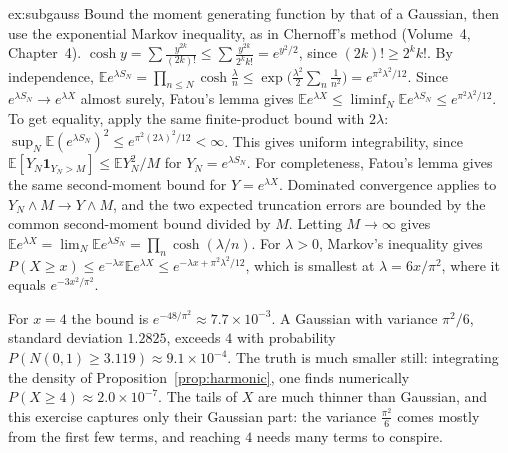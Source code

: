 \begin{solution}{ex:subgauss}
\idea Bound the moment generating function by that of a Gaussian, then use the exponential Markov inequality, as in Chernoff's method
(Volume~4, Chapter~4).
\writeup $\cosh y=\sum\frac{y^{2k}}{(2k)!}\le\sum\frac{y^{2k}}{2^kk!}=e^{y^2/2}$, since $(2k)!\ge2^kk!$. By independence,
$\mathbb E e^{\lambda S_N}=\prod_{n\le N}\cosh\frac\lambda n\le\exp\bigl(\frac{\lambda^2}2\sum_n\frac1{n^2}\bigr)=e^{\pi^2\lambda^2/12}$. Since
$e^{\lambda S_N}\to e^{\lambda X}$ almost surely, Fatou's lemma gives $\mathbb E e^{\lambda X}\le\liminf_N\mathbb E e^{\lambda S_N}\le e^{\pi^2\lambda^2/12}$.
To get equality, apply the same finite-product bound with $2\lambda$: $\sup_N\mathbb E(e^{\lambda S_N})^2\le e^{\pi^2(2\lambda)^2/12}<\infty$. This gives uniform integrability, since $\mathbb E[Y_N\mathbf1_{Y_N>M}]\le\mathbb E Y_N^2/M$ for $Y_N=e^{\lambda S_N}$. For completeness, Fatou's lemma gives the same second-moment bound for $Y=e^{\lambda X}$. Dominated convergence applies to $Y_N\wedge M\to Y\wedge M$, and the two expected truncation errors are bounded by the common second-moment bound divided by $M$. Letting $M\to\infty$ gives $\mathbb E e^{\lambda X}=\lim_N\mathbb E e^{\lambda S_N}=\prod_n\cosh(\lambda/n)$. For $\lambda>0$,
Markov's inequality gives $P(X\ge x)\le e^{-\lambda x}\mathbb E e^{\lambda X}\le e^{-\lambda x+\pi^2\lambda^2/12}$, which is smallest at $\lambda=6x/\pi^2$,
where it equals $e^{-3x^2/\pi^2}$.

For $x=4$ the bound is $e^{-48/\pi^2}\approx7.7\times10^{-3}$. A Gaussian with variance $\pi^2/6$, standard deviation $1.2825$, exceeds $4$ with
probability $P(N(0,1)\ge3.119)\approx9.1\times10^{-4}$. The truth is much smaller still: integrating the density of Proposition~\ref{prop:harmonic},
one finds numerically $P(X\ge4)\approx2.0\times10^{-7}$. The tails of $X$ are much thinner than Gaussian, and this exercise captures only their
Gaussian part: the variance $\frac{\pi^2}6$ comes mostly from the first few terms, and reaching $4$ needs many terms to conspire.
\end{solution}

